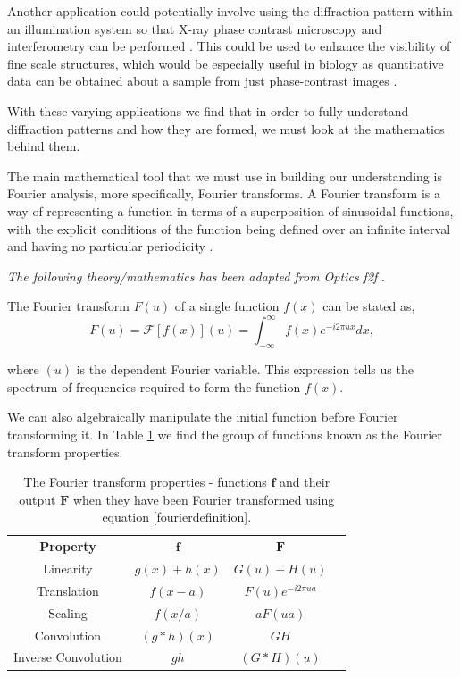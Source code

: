 \documentclass[twocolumn]{revtex4}
\begin{document}
Another application could potentially involve using the diffraction pattern within an illumination system so that X-ray phase contrast microscopy and interferometry can be performed \cite{singleslit}. This could be used to enhance the visibility of fine scale structures, which would be especially useful in biology as quantitative data can be obtained about a sample from just phase-contrast images \cite{xrayphase}.

With these varying applications we find that in order to fully understand diffraction patterns and how they are formed, we must look at the mathematics behind them. 

The main mathematical tool that we must use in building our understanding is Fourier analysis, more specifically, Fourier transforms. A Fourier transform is a way of representing a function in terms of a superposition of sinusoidal functions, with the explicit conditions of the function being defined over an infinite interval and having no particular periodicity \cite{mathmethods}.

\textit{The following theory/mathematics has been adapted from Optics f2f} \cite{of2f}.

The Fourier transform $F(u)$ of a single function $f(x)$ can be stated as,
\begin{equation}
F(u) = \mathcal{F}[f(x)](u) = \int_{-\infty}^\infty f(x) e^{-i2\pi ux}dx,
\label{fourierdefinition}
\end{equation}

where $(u)$ is the dependent Fourier variable. This expression tells us the spectrum of frequencies required to form the function $f(x)$.

We can also algebraically manipulate the initial function before Fourier transforming it. In Table \ref{fourierproperties} we find the group of functions known as the Fourier transform properties.
\begin{table}[h!]
\centering
\begin{tabular}{c@{\hskip 20pt}c@{\hskip 20pt}c@{\hskip 20pt}c} 
 \hline
 \textbf{Property} & \textbf{$\boldsymbol{f}$} & \textbf{$\boldsymbol{F}$} \\ [0.5ex] 
 Linearity				& $g(x)+h(x)$ & $G(u) + H(u)$ \\
 Translation 			& $f(x-a)$ 	& $F(u)e^{-i2\pi ua}$ \\ 
 Scaling 				& $f({x/a})$ & $aF(ua)$ \\
 Convolution			& $(g*h)(x)$ & $GH$ \\
 Inverse Convolution		& $gh$ & $ (G*H)(u)$ \\
 \hline
\end{tabular}
\caption{The Fourier transform properties - functions $\boldsymbol{f}$ and their output $\textbf{$\boldsymbol{F}$}$ when they have been Fourier transformed using equation \ref{fourierdefinition}.}
\label{fourierproperties}
\end{table}
\end{document}
